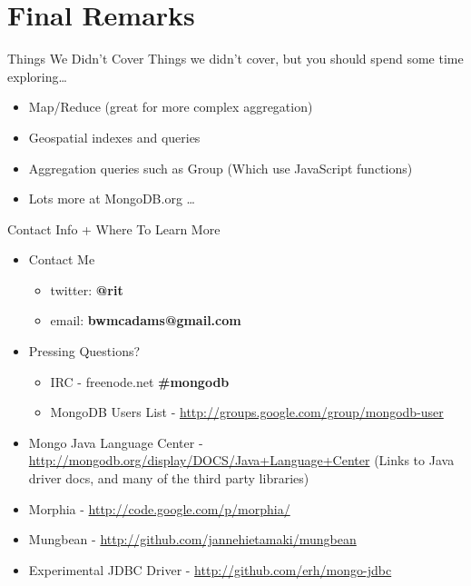 \documentclass{beamer}
\begin{document}
\section{Final Remarks}
\begin{frame}{Things We Didn't Cover}
    Things we didn't cover, but you should spend some time exploring\ldots
    \begin{itemize}
        \item Map/Reduce (great for more complex aggregation)
        \item Geospatial indexes and queries
        \item Aggregation queries such as Group (Which use JavaScript functions)
        \item Lots more at MongoDB.org \ldots
    \end{itemize}
\end{frame}
\begin{frame}{Contact Info + Where To Learn More}
    \begin{itemize}
        \item Contact Me
        \begin{itemize}
            \item twitter: {\bf @rit}
            \item email: {\bf bwmcadams@gmail.com}
        \end{itemize}
        \item Pressing Questions?
        \begin{itemize}
            \item IRC - {freenode.net \bf\#mongodb}
            \item MongoDB Users List - \url{http://groups.google.com/group/mongodb-user}
        \end{itemize}
    \item Mongo Java Language Center - \url{http://mongodb.org/display/DOCS/Java+Language+Center} {(\tiny Links to Java driver docs, and many of the third party libraries)}
        \item Morphia - \url{http://code.google.com/p/morphia/}
        \item Mungbean - \url{http://github.com/jannehietamaki/mungbean}
        \item Experimental JDBC Driver - \url{http://github.com/erh/mongo-jdbc}
    \end{itemize}
\end{frame}
\end{document}
